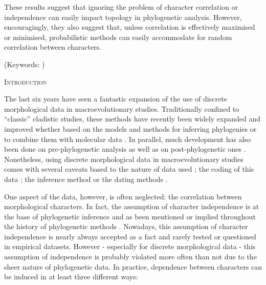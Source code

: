 \documentclass[12pt,letterpaper]{article}
\renewcommand{\section}[1]{%
\bigskip
\begin{center}
\begin{Large}
\normalfont\scshape #1
\medskip
\end{Large}
\end{center}}
\begin{document}
These results suggest that ignoring the problem of character correlation or independence can easily impact topology in phylogenetic analysis.
However, encouragingly, they also suggest that, unless correlation is effectively maximised or minimised, probabilistic methods can easily accommodate for random correlation between characters.


\noindent (Keywords: )\\

\vspace{1.5in}

\newpage 

%
%
\section{Introduction}

The last six years have seen a fantastic expansion of the use of discrete morphological data in macroevolutionary studies.
Traditionally confined to ``classic'' cladistic studies, these methods have recently been widely expanded and improved whether based on the models and methods for inferring phylogenies \citep[e.g.][]{heath2014fossilized,Wright01072016} or to combine them with molecular data \citep[e.g.][]{pyrondivergence2011,ronquista2012}.
In parallel, much development has also been done on pre-phylogenetic analysis \citep[e.g. data collection;][]{morphobank} as well as on post-phylogenetic ones \citep[e.g. morphological disparity analysis;][]{Close2015,Claddis}.
Nonetheless, using discrete morphological data in macroevolutionary studies comes with several caveats based to the nature of data used \citep{Guillerme2016146,bapst2017combined}; the coding of this data \citep{Brazeau2011,simoes2017giant}; the inference method \citep{spencerefficacy2013,wrightbayesian2014,OReilly20160081,puttick2017uncertain,goloboff2017weighted} or the dating methods \citep{Arcila2015131,o2016tips}.

One aspect of the data, however, is often neglected: the correlation between morphological characters.
In fact, the assumption of character independence is at the base of phylogenetic inference and as been mentioned or implied throughout the history of phylogenetic methods \citep[e.g.][]{joysey1982problems,felsenstein1985phylogenies,lewisa2001,felsenstein2004inferring}.
Nowadays, this assumption of character independence is nearly always accepted as a fact and rarely tested or questioned in empirical datasets.
However - especially for discrete morphological data - this assumption of independence is probably violated more often than not due to the sheer nature of phylogenetic data.
In practice, dependence between characters can be induced in at least three different ways:
\end{document}
